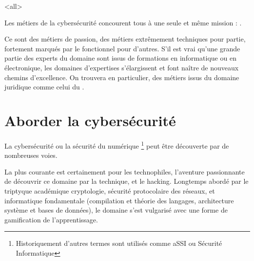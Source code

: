 \mode<all>{}

Les métiers de la cybersécurité concourent tous à une seule et même mission : .

Ce sont des métiers de passion, des métiers extrêmement techniques pour partie, fortement marqués par le fonctionnel pour d'autres. S'il est vrai qu'une grande partie des experts du domaine sont issus de formations en informatique ou en électronique, les domaines d'expertises s'élargissent et font naître de nouveaux chemins d'excellence. On trouvera en particulier, des métiers issus du domaine juridique comme celui du 
.    





\section{Aborder la cybersécurité}


La cybersécurité ou la sécurité du numérique \footnote{Historiquement d'autres termes sont utilisés comme  \gls{aSSI} ou  Sécurité Informatique} peut être découverte par de nombreuses voies.

La plus courante est certainement pour les technophiles, l'aventure passionnante de découvrir ce domaine par la technique, et le hacking.  Longtemps abordé par le triptyque académique cryptologie,   sécurité  protocolaire des réseaux, et informatique fondamentale (compilation et théorie des langages, architecture système et bases de données), le domaine s'est vulgarisé avec une forme de gamification de l'apprentissage.

